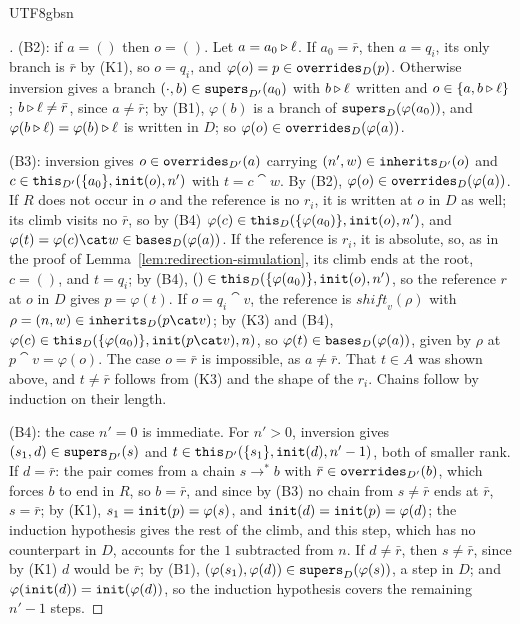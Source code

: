 \begin{CJK*}{UTF8}{gbsn}
\begin{proof}[]
\begin{sloppypar}
(B2): if $a = ()$ then $o = ()$. Let $a = a_0 \mathbin{\triangleright} \ell$. If $a_0 = \bar r$, then $a = q_i$, its only
branch is $\bar r$ by (K1), so $o = q_i$, and $\varphi(o) = p \in \mathtt{overrides}_D(p)$. Otherwise inversion
gives a branch $(\cdot, b) \in \mathtt{supers}_{D'}(a_0)$ with $b \mathbin{\triangleright} \ell$ written and
$o \in \{a, b \mathbin{\triangleright} \ell\}$; $b \mathbin{\triangleright} \ell \ne \bar r$, since $a \ne \bar r$; by (B1), $\varphi(b)$ is a
branch of $\mathtt{supers}_D(\varphi(a_0))$, and $\varphi(b \mathbin{\triangleright} \ell) = \varphi(b) \mathbin{\triangleright} \ell$ is written in
$D$; so $\varphi(o) \in \mathtt{overrides}_D(\varphi(a))$.

(B3): inversion gives $o \in \mathtt{overrides}_{D'}(a)$ carrying $(n', w) \in \mathtt{inherits}_{D'}(o)$ and
$c \in \mathtt{this}_{D'}(\{a_0\}, \mathtt{init}(o), n')$ with $t = c \cat w$. By (B2),
$\varphi(o) \in \mathtt{overrides}_D(\varphi(a))$. If $R$ does not occur in $o$ and the reference is no $r_i$,
it is written at $o$ in $D$ as well; its climb visits no $\bar r$, so by (B4)
$\varphi(c) \in \mathtt{this}_D(\{\varphi(a_0)\}, \mathtt{init}(o), n')$, and
$\varphi(t) = \varphi(c) \cat w \in \bases_D(\varphi(a))$. If the reference is $r_i$, it is absolute, so,
as in the proof of Lemma~\ref{lem:redirection-simulation}, its climb ends at the root, $c = ()$, and
$t = q_i$; by (B4), $() \in \mathtt{this}_D(\{\varphi(a_0)\}, \mathtt{init}(o), n')$, so the reference $r$ at $o$ in $D$
gives $p = \varphi(t)$. If $o = q_i \cat v$, the reference is $\mathit{shift}_v(\rho)$ with
$\rho = (n, w) \in \inherits_D(p \cat v)$; by (K3) and (B4),
$\varphi(c) \in \this_D(\{\varphi(a_0)\}, \init(p \cat v), n)$, so $\varphi(t) \in \mathtt{bases}_D(\varphi(a))$,
given by $\rho$ at $p \cat v = \varphi(o)$. The case $o = \bar r$ is impossible, as $a \ne \bar r$. That
$t \in A$ was shown above, and $t \ne \bar r$ follows from (K3) and the shape of the $r_i$. Chains
follow by induction on their length.

(B4): the case $n' = 0$ is immediate. For $n' > 0$, inversion gives $(s_1, d) \in \mathtt{supers}_{D'}(s)$ and
$t \in \mathtt{this}_{D'}(\{s_1\}, \mathtt{init}(d), n' - 1)$, both of smaller rank. If $d = \bar r$: the pair comes from a chain
$s \to^* b$ with $\bar r \in \mathtt{overrides}_{D'}(b)$, which forces $b$ to end in $R$, so $b = \bar r$, and since by (B3) no chain from $s \ne \bar r$ ends at
$\bar r$, $s = \bar r$; by (K1),
$s_1 = \mathtt{init}(p) = \varphi(s)$, and $\mathtt{init}(d) = \mathtt{init}(p) = \varphi(d)$; the induction hypothesis gives
the rest of the climb, and this step, which has no counterpart in $D$, accounts for the $1$ subtracted
from $n$. If $d \ne \bar r$, then $s \ne \bar r$, since by (K1) $d$ would be $\bar r$; by (B1),
$(\varphi(s_1), \varphi(d)) \in \mathtt{supers}_D(\varphi(s))$, a step in $D$; and
$\varphi(\mathtt{init}(d)) = \mathtt{init}(\varphi(d))$, so the induction hypothesis covers the remaining $n' - 1$
steps.


\end{sloppypar}
\end{proof}
\end{CJK*}
